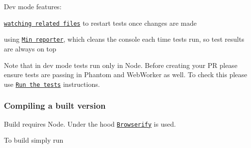 Dev mode features\+:
\begin{DoxyItemize}
\item \href{https://mochajs.org/#w---watch}{\tt watching related files} to restart tests once changes are made
\item using \href{https://mochajs.org/#min}{\tt Min reporter}, which cleans the console each time tests run, so test results are always on top
\end{DoxyItemize}

Note that in dev mode tests run only in Node. Before creating your PR please ensure tests are passing in Phantom and Web\+Worker as well. To check this please use \href{#run-the-tests}{\tt Run the tests} instructions.

\subsubsection*{Compiling a built version}

Build requires Node. Under the hood \href{http://browserify.org/}{\tt Browserify} is used.

To build simply run 
 